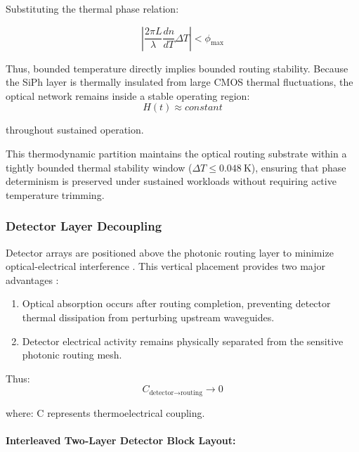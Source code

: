\documentclass[journal]{IEEEtran}
\begin{document}
Substituting the thermal phase relation:

\begin{equation}
| \frac {2 \pi L}{\lambda} \frac{dn}{dT} \Delta T |
< \phi_{\text{max}}
\end{equation}

Thus, bounded temperature directly implies bounded routing stability. Because the SiPh layer is thermally insulated from large CMOS thermal fluctuations, the optical network remains inside a stable operating region:
\begin{equation}
H(t) \approx constant 
\end{equation}

throughout sustained operation.

This thermodynamic partition maintains the optical routing substrate within a tightly bounded thermal stability window ($\Delta T \le 0.048~\mathrm{K}$), ensuring that phase determinism is preserved under sustained workloads without requiring active temperature trimming.

\subsubsection{\textbf{Detector Layer Decoupling}}

Detector arrays are positioned above the photonic routing layer to minimize optical-electrical interference \cite{Steckler2024,Chen2025}.  This vertical placement provides two major advantages :

\begin{enumerate}
\item  Optical absorption occurs after routing completion, preventing detector thermal dissipation from perturbing upstream waveguides.
\item  Detector electrical activity remains physically separated from the sensitive photonic routing mesh.
\end{enumerate}

Thus:
\begin{equation}
C_{\text{detector} \rightarrow \text{routing}} \rightarrow 0 
\end{equation}

where: C represents thermoelectrical coupling.

\paragraph{\textbf{Interleaved Two-Layer Detector Block Layout:}}
\end{document}

